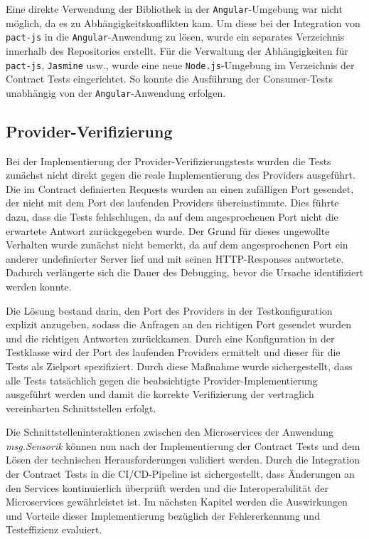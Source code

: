 Eine direkte Verwendung der Bibliothek in der \texttt{\gls{Angular}}-Umgebung war nicht möglich, da es zu Abhängigkeitskonflikten kam.
Um diese bei der Integration von \texttt{pact-js} in die \texttt{\gls{Angular}}-Anwendung zu lösen, wurde ein separates Verzeichnis innerhalb des Repositories erstellt.
Für die Verwaltung der Abhängigkeiten für \texttt{pact-js}, \texttt{Jasmine} usw., wurde eine neue \texttt{Node.js}-Umgebung im Verzeichnis der Contract Tests eingerichtet.
So konnte die Ausführung der Consumer-Tests unabhängig von der \texttt{\gls{Angular}}-Anwendung erfolgen.

\subsection{Provider-Verifizierung}\label{subsec:implementation_problems_provider-verification}

Bei der Implementierung der Provider-Verifizierungstests wurden die Tests zunächst nicht direkt gegen die reale Implementierung des Providers ausgeführt.
Die im Contract definierten Requests wurden an einen zufälligen Port gesendet, der nicht mit dem Port des laufenden Providers übereinstimmte.
Dies führte dazu, dass die Tests fehlschlugen, da auf dem angesprochenen Port nicht die erwartete Antwort zurückgegeben wurde.
Der Grund für dieses ungewollte Verhalten wurde zunächst nicht bemerkt, da auf dem angesprochenen Port ein anderer undefinierter Server lief und mit seinen \gls{HTTP}-Responses antwortete.
Dadurch verlängerte sich die Dauer des Debugging, bevor die Ursache identifiziert werden konnte.

Die Lösung bestand darin, den Port des Providers in der Testkonfiguration explizit anzugeben, sodass die Anfragen an den richtigen Port gesendet wurden und die richtigen Antworten zurückkamen.
Durch eine Konfiguration in der Testklasse wird der Port des laufenden Providers ermittelt und dieser für die Tests als Zielport spezifiziert.
Durch diese Maßnahme wurde sichergestellt, dass alle Tests tatsächlich gegen die beabsichtigte Provider-Implementierung ausgeführt werden und damit die korrekte Verifizierung der vertraglich vereinbarten Schnittstellen erfolgt.

Die Schnittstelleninteraktionen zwischen den Microservices der Anwendung \textit{msg.Sensorik} können nun nach der Implementierung der Contract Tests und dem Lösen der technischen Herausforderungen validiert werden.
Durch die Integration der Contract Tests in die \gls{CI}/\gls{CD}-\gls{Pipeline} ist sichergestellt, dass Änderungen an den Services kontinuierlich überprüft werden und die Interoperabilität der Microservices gewährleistet ist.
Im nächsten Kapitel werden die Auswirkungen und Vorteile dieser Implementierung bezüglich der Fehlererkennung und Testeffizienz evaluiert.